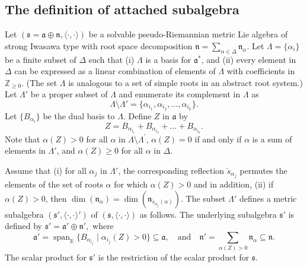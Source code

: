 \documentclass[12pt]{amsart}
\newcommand\R{\mathbb R}
\newcommand\boldZ{{\mathbb Z}}
\newcommand{\myspan}{\operatorname{span}}
\newcommand{\fraka}{\ensuremath{\mathfrak{a}} }
\newcommand{\frakn}{\ensuremath{\mathfrak{n}} }
\newcommand{\fraks}{\ensuremath{\mathfrak{s}} }
\renewcommand\a{{\mathfrak{a}}}
\newcommand\n{{\mathfrak{n}}}
\newcommand\s{{\mathfrak{s}}}
\newcommand\ip{{\langle\cdot {,} \cdot\rangle}}
\theoremstyle{plain}
\theoremstyle{definition}
\theoremstyle{remark}
\numberwithin{equation}{section}
\numberwithin{theorem}{section}
\begin{document}
\subsection{The definition of attached subalgebra}\label{subsection: definitions}
Let $(\fraks=\a \oplus \n,\ip)$ be a solvable pseudo-Riemannian metric  Lie algebra of strong Iwasawa type with
root space decomposition  $\n = \sum_{\alpha \in \Delta} \n_\alpha$.  Let $\Lambda = \{\alpha_i \}$ be a finite subset  of $\Delta$ such that
(i) $\Lambda$ is a basis for $\a^\ast$, and (ii) every element in $\Delta$ can be
expressed as a linear combination of  elements of $\Lambda$ with coefficients in
$\boldZ_{\geq 0}$. (The set $\Lambda$ is analogous to a set of simple 
roots in an abstract root
system.)
Let   $\Lambda'$ be a proper subset of $\Lambda$ and enumerate its complement in
$\Lambda$ as  
\begin{equation}\label{eqn: dual basis prime} \Lambda \setminus \Lambda' = \{\alpha_{i_1}, \alpha_{i_2}, \dots, \alpha_{i_k} \} .\end{equation}
Let $\{B_{\alpha_{i}} \}$ be the dual basis to $\Lambda.$
Define $Z$ in $\fraka$ by 
\begin{equation}\label{eqn: char-vector}
Z = B_{\alpha_{i_1}} + B_{\alpha_{i_2}} + \dots + B_{\alpha_{i_k}}.\end{equation}
Note that $\alpha(Z)> 0$ for all $\alpha$ in $\Lambda \setminus \Lambda^\prime$, $\alpha(Z)=0$ if and only if $\alpha$ is a sum of elements in $\Lambda'$, and $\alpha(Z) \geq 0$ for all $\alpha$ in $\Delta$. 

Assume that (i) for all  $\alpha_j$ in $\Lambda'$, the corresponding  reflection  $\check{s}_{\alpha_j}$   permutes 
the elements of the set of roots $\alpha$ for which 
$\alpha(Z)>0$ and in addition, (ii) if $\alpha(Z)>0$, then
$\dim(\n_\alpha) = \dim(\n_{\check{s}_{\alpha_j}(\alpha)})$.
 The subset $\Lambda'$ defines a metric subalgebra $(\fraks', \ip')$ of  $(\fraks,\ip)$ as follows.
The underlying subalgebra $\fraks'$ is defined by $\fraks' = \a' \oplus \n',$ where 
 \begin{equation}\label{defn: fraka-prime-frakn-prime}
 \fraka' = \myspan_{\R}\{B_{\alpha_{i_j}}  \mid \alpha_{i_j}(Z)>0\} 
 \subseteq \fraka, \quad \text{and} \quad 
 \frakn' = \sum_{\alpha(Z) > 0} \n_\alpha \subseteq \n. 
\end{equation}
The scalar product for  $\fraks'$ is  the restriction of the scalar product for $\s$.
\end{document}
